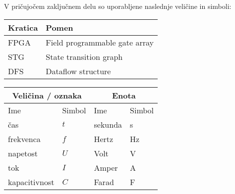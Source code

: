 \seznamsimbolovinkratic
V pričujočem zaključnem delu so uporabljene naslednje veličine in simboli:

\begin{center}
	\begin{tabular}{*{2}{l}} 
		\hline
		\bf{Kratica}        & \bf{Pomen}    					\\ 
		\hline
		FPGA                & Field programmable gate array		\\
		STG                 & State transition graph			\\
		DFS                 & Dataflow structure			\\
		\hline
	\end{tabular}
\end{center}

\begin{center}
	\begin{tabular}{*{4}{l}} \hline
		\multicolumn{2}{c}{\bf{Veličina / oznaka}}          & \multicolumn{2}{c}{\bf{Enota}} 	\\ 
		\hline
		Ime                & Simbol                         & Ime      			& Simbol              	\\ 
		\hline
		čas                & $t$                            & sekunda  			& s                   	\\
		frekvenca          & $f$                            & Hertz    			& Hz                  	\\
		napetost           & $U$                         	& Volt        		& V		            	\\
		tok                & $I$                            & Amper 			& A                  	\\
		kapacitivnost      & $C$                   			& Farad     		& F                   	\\
		\hline
	\end{tabular}
\end{center}



